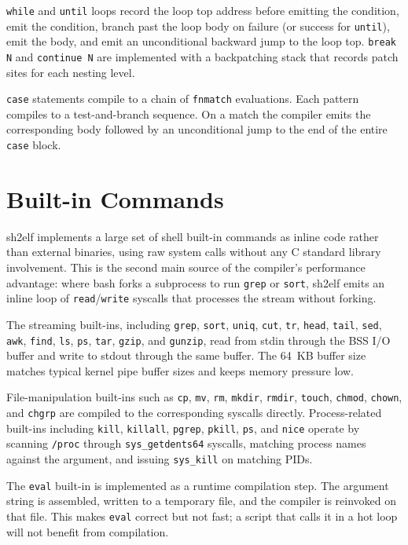 \documentclass[10pt,twocolumn]{article}
\begin{document}
\texttt{while} and \texttt{until} loops record the loop top address
before emitting the condition, emit the condition, branch past the
loop body on failure (or success for \texttt{until}), emit the body,
and emit an unconditional backward jump to the loop top. \texttt{break
N} and \texttt{continue N} are implemented with a backpatching stack
that records patch sites for each nesting level.

\texttt{case} statements compile to a chain of \texttt{fnmatch}
evaluations. Each pattern compiles to a test-and-branch sequence. On a
match the compiler emits the corresponding body followed by an
unconditional jump to the end of the entire \texttt{case} block.


\section{Built-in Commands}

sh2elf implements a large set of shell built-in commands as inline
code rather than external binaries, using raw system calls without any
C standard library involvement. This is the second main source of the
compiler's performance advantage: where bash forks a subprocess to run
\texttt{grep} or \texttt{sort}, sh2elf emits an inline loop of
\texttt{read}/\texttt{write} syscalls that processes the stream
without forking.

The streaming built-ins, including \texttt{grep}, \texttt{sort},
\texttt{uniq}, \texttt{cut}, \texttt{tr}, \texttt{head}, \texttt{tail},
\texttt{sed}, \texttt{awk}, \texttt{find}, \texttt{ls}, \texttt{ps},
\texttt{tar}, \texttt{gzip}, and \texttt{gunzip}, read from stdin
through the BSS I/O buffer and write to stdout through the same
buffer. The 64~KB buffer size matches typical kernel pipe buffer sizes
and keeps memory pressure low.

File-manipulation built-ins such as \texttt{cp}, \texttt{mv},
\texttt{rm}, \texttt{mkdir}, \texttt{rmdir}, \texttt{touch},
\texttt{chmod}, \texttt{chown}, and \texttt{chgrp} are compiled to the
corresponding syscalls directly. Process-related built-ins including
\texttt{kill}, \texttt{killall}, \texttt{pgrep}, \texttt{pkill},
\texttt{ps}, and \texttt{nice} operate by scanning \texttt{/proc}
through \texttt{sys\_getdents64} syscalls, matching process names
against the argument, and issuing \texttt{sys\_kill} on matching PIDs.

The \texttt{eval} built-in is implemented as a runtime compilation
step. The argument string is assembled, written to a temporary file,
and the compiler is reinvoked on that file. This makes \texttt{eval}
correct but not fast; a script that calls it in a hot loop will not
benefit from compilation.
\end{document}
